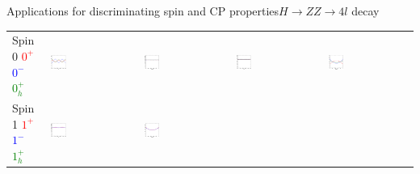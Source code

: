 \documentclass[usenames,dvipsnames,svgnames,table]{beamer}
\begin{document}
\begin{frame}{Applications for discriminating spin and CP properties}{$H\to ZZ\to 4l$ decay}
\begin{tabular}{m{}m{}m{}m{}m{}}
\footnotesize\centering Spin 0 \tiny \textcolor{red}{$0^+$} \textcolor{blue}{$0^-$} \textcolor{Green}{$0_h^+$} &
\noindent\includegraphics[width=0.18\textwidth]{onthespinandparity/phi_125GeV_spin0} &
\noindent\includegraphics[width=0.18\textwidth]{onthespinandparity/costhetastar_125GeV_spin0} &
\noindent\includegraphics[width=0.18\textwidth]{onthespinandparity/phistar1_125GeV_spin0} &
\noindent\includegraphics[width=0.18\textwidth]{onthespinandparity/costheta1_125GeV_spin0} \\
\footnotesize\centering Spin 1 \tiny \textcolor{red}{$1^+$} \textcolor{blue}{$1^-$} \textcolor{Green}{$1_h^+$} &
\noindent\includegraphics[width=0.18\textwidth]{onthespinandparity/phi_125GeV_spin1} &
\noindent\includegraphics[width=0.18\textwidth]{onthespinandparity/costhetastar_125GeV_spin1} &

\end{tabular}
\end{frame}
\end{document}
